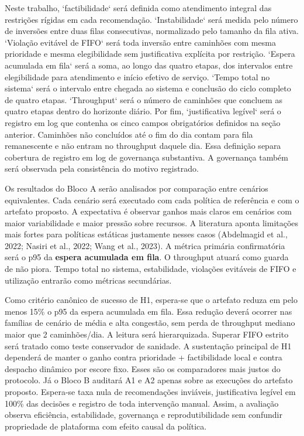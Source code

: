 \documentclass[
  12pt,
  oneside,
  a4paper,
  sumario=tradicional,
  brazil
]{abntex2}
\begin{document}
Neste trabalho, `factibilidade` ser\'a definida como atendimento integral das restri\c{c}\~oes r\'igidas em cada recomenda\c{c}\~ao. `Instabilidade` ser\'a medida pelo n\'umero de invers\~oes entre duas filas consecutivas, normalizado pelo tamanho da fila ativa. `Viola\c{c}\~ao evit\'avel de FIFO` ser\'a toda invers\~ao entre caminh\~oes com mesma prioridade e mesma elegibilidade sem justificativa expl\'icita por restri\c{c}\~ao. `Espera acumulada em fila` ser\'a a soma, ao longo das quatro etapas, dos intervalos entre elegibilidade para atendimento e in\'icio efetivo de servi\c{c}o. `Tempo total no sistema` ser\'a o intervalo entre chegada ao sistema e conclus\~ao do ciclo completo de quatro etapas. `Throughput` ser\'a o n\'umero de caminh\~oes que concluem as quatro etapas dentro do horizonte di\'ario. Por fim, `justificativa leg\'ivel` ser\'a o registro em log que contenha os cinco campos obrigat\'orios definidos na se\c{c}\~ao anterior. Caminh\~oes n\~ao conclu\'idos at\'e o fim do dia contam para fila remanescente e n\~ao entram no throughput daquele dia. Essa defini\c{c}\~ao separa cobertura de registro em log de governan\c{c}a substantiva. A governan\c{c}a tamb\'em ser\'a observada pela consist\^encia do motivo registrado.

Os resultados do Bloco A ser\~ao analisados por compara\c{c}\~ao entre cen\'arios equivalentes. Cada cen\'ario ser\'a executado com cada pol\'itica de refer\^encia e com o artefato proposto. A expectativa \'e observar ganhos mais claros em cen\'arios com maior variabilidade e maior press\~ao sobre recursos. A literatura aponta limita\c{c}\~oes mais fortes para pol\'iticas est\'aticas justamente nesses casos (Abdelmagid et al., 2022; Nasiri et al., 2022; Wang et al., 2023). A m\'etrica prim\'aria confirmat\'oria ser\'a o p95 da \textbf{espera acumulada em fila}. O throughput atuar\'a como guarda de n\~ao piora. Tempo total no sistema, estabilidade, viola\c{c}\~oes evit\'aveis de FIFO e utiliza\c{c}\~ao entrar\~ao como m\'etricas secund\'arias.

Como crit\'erio can\^onico de sucesso de H1, espera-se que o artefato reduza em pelo menos 15\% o p95 da espera acumulada em fila. Essa redu\c{c}\~ao dever\'a ocorrer nas fam\'ilias de cen\'ario de m\'edia e alta congest\~ao, sem perda de throughput mediano maior que 2 caminh\~oes/dia. A leitura ser\'a hierarquizada. Superar FIFO estrito ser\'a tratado como teste conservador de sanidade. A sustenta\c{c}\~ao principal de H1 depender\'a de manter o ganho contra prioridade + factibilidade local e contra despacho din\^amico por escore fixo. Esses s\~ao os comparadores mais justos do protocolo. J\'a o Bloco B auditar\'a A1 e A2 apenas sobre as execu\c{c}\~oes do artefato proposto. Espera-se taxa nula de recomenda\c{c}\~oes invi\'aveis, justificativa leg\'ivel em 100\% das decis\~oes e registro de toda interven\c{c}\~ao manual. Assim, a avalia\c{c}\~ao observa efici\^encia, estabilidade, governan\c{c}a e reprodutibilidade sem confundir propriedade de plataforma com efeito causal da pol\'itica.
\end{document}
